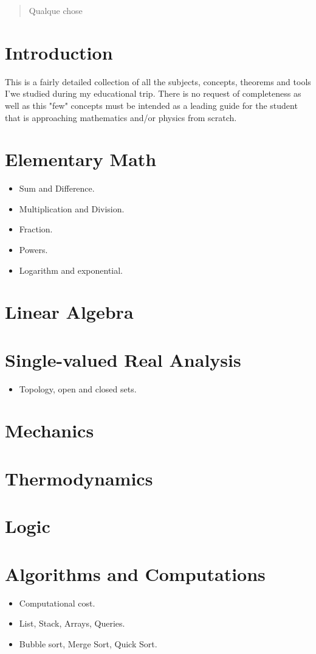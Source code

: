 \documentclass[10pt]{article}
\begin{document}
\begin{abstract}
	Qualque chose
\end{abstract}
\section*{Introduction}
This is a fairly detailed collection of all the subjects, concepts, theorems and tools I'we studied during my educational trip. There is no request of completeness as well as this "few" concepts must be intended as a leading guide for the student that is approaching mathematics and/or physics from scratch.
\section{Elementary Math}
\begin{itemize}
	\item Sum and Difference.
	\item Multiplication and Division.
	\item Fraction.
	\item Powers.
	\item Logarithm and exponential.
\end{itemize}
\section{Linear Algebra}
\section{Single-valued Real Analysis}
\begin{itemize}
	\item Topology, open and closed sets.
\end{itemize}
\section{Mechanics}
\section{Thermodynamics}
\section{Logic}
\section{Algorithms and Computations}
\begin{itemize}
	\item Computational cost.
	\item List, Stack, Arrays, Queries.
	\item Bubble sort, Merge Sort, Quick Sort.
\end{itemize}
\end{document}
